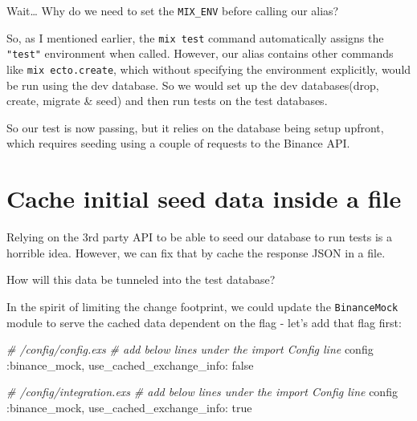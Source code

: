 \documentclass[
  oneside]{book}
\newenvironment{Shaded}{\begin{snugshade}}{\end{snugshade}}
\newcommand{\CommentTok}[1]{\textcolor[rgb]{0.56,0.35,0.01}{\textit{#1}}}
\newcommand{\ConstantTok}[1]{\textcolor[rgb]{0.56,0.35,0.01}{#1}}
\newcommand{\NormalTok}[1]{#1}
\newcommand{\VariableTok}[1]{\textcolor[rgb]{0.00,0.00,0.00}{#1}}
\begin{document}
Wait\ldots{} Why do we need to set the \texttt{MIX\_ENV} before calling our alias?

So, as I mentioned earlier, the \texttt{mix\ test} command automatically assigns the \texttt{"test"} environment when called. However, our alias contains other commands like \texttt{mix\ ecto.create}, which without specifying the environment explicitly, would be run using the dev database. So we would set up the dev databases(drop, create, migrate \& seed) and then run tests on the test databases.

So our test is now passing, but it relies on the database being setup upfront, which requires seeding using a couple of requests to the Binance API.

\section{Cache initial seed data inside a file}\label{cache-initial-seed-data-inside-a-file}

Relying on the 3rd party API to be able to seed our database to run tests is a horrible idea. However, we can fix that by cache the response JSON in a file.

How will this data be tunneled into the test database?

In the spirit of limiting the change footprint, we could update the \texttt{BinanceMock} module to serve the cached data dependent on the flag - let's add that flag first:

\begin{Shaded}
\begin{Highlighting}[]
\CommentTok{\# /config/config.exs}
\CommentTok{\# add below lines under the \textasciigrave{}import Config\textasciigrave{} line }
\NormalTok{config }\VariableTok{:binance\_mock}\NormalTok{,}
  \VariableTok{use\_cached\_exchange\_info:} \ConstantTok{false}
\end{Highlighting}
\end{Shaded}

\begin{Shaded}
\begin{Highlighting}[]
\CommentTok{\# /config/integration.exs}
\CommentTok{\# add below lines under the \textasciigrave{}import Config\textasciigrave{} line }
\NormalTok{config }\VariableTok{:binance\_mock}\NormalTok{,}
  \VariableTok{use\_cached\_exchange\_info:} \ConstantTok{true}
\end{Highlighting}
\end{Shaded}
\end{document}
